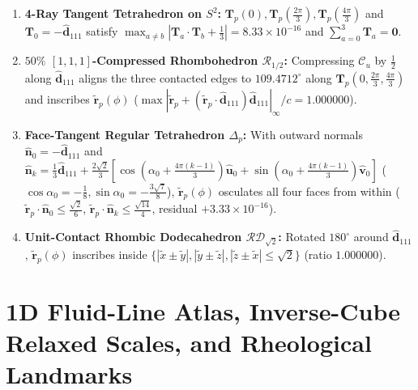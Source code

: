 \documentclass[11pt, a4paper]{article}
\begin{document}
\begin{enumerate}[leftmargin=1.8em, itemsep=2pt]
    \item \textbf{4-Ray Tangent Tetrahedron on $S^2$:} $\mathbf{T}_p(0), \mathbf{T}_p(\frac{2\pi}{3}), \mathbf{T}_p(\frac{4\pi}{3})$ and $\mathbf{T}_0 = -\hat{\mathbf{d}}_{111}$ satisfy $\max_{a\neq b}|\mathbf{T}_a\cdot\mathbf{T}_b + \frac{1}{3}| = 8.33 \times 10^{-16}$ and $\sum_{a=0}^3 \mathbf{T}_a = \mathbf{0}$.
    \item \textbf{$50\%$ $[1,1,1]$-Compressed Rhombohedron $\mathcal{R}_{1/2}$:} Compressing $\mathcal{C}_u$ by $\frac{1}{2}$ along $\hat{\mathbf{d}}_{111}$ aligns the three contacted edges to $109.4712^\circ$ along $\mathbf{T}_p(0,\frac{2\pi}{3},\frac{4\pi}{3})$ and inscribes $\tilde{\mathbf{r}}_p(\phi)$ ($\max|\tilde{\mathbf{r}}_p + (\tilde{\mathbf{r}}_p\cdot\hat{\mathbf{d}}_{111})\hat{\mathbf{d}}_{111}|_\infty / c = 1.000000$).
    \item \textbf{Face-Tangent Regular Tetrahedron $\Delta_p$:} With outward normals $\hat{\mathbf{n}}_0 = -\hat{\mathbf{d}}_{111}$ and $\hat{\mathbf{n}}_k = \frac{1}{3}\hat{\mathbf{d}}_{111} + \frac{2\sqrt{2}}{3}[\cos(\alpha_0 + \frac{4\pi(k-1)}{3})\hat{\mathbf{u}}_0 + \sin(\alpha_0 + \frac{4\pi(k-1)}{3})\hat{\mathbf{v}}_0]$ ($\cos\alpha_0 = -\frac{1}{8}, \sin\alpha_0 = -\frac{3\sqrt{7}}{8}$), $\tilde{\mathbf{r}}_p(\phi)$ osculates all four faces from within ($\tilde{\mathbf{r}}_p\cdot\hat{\mathbf{n}}_0 \le \frac{\sqrt{2}}{6}$, $\tilde{\mathbf{r}}_p\cdot\hat{\mathbf{n}}_k \le \frac{\sqrt{14}}{4}$, residual $+3.33 \times 10^{-16}$).
    \item \textbf{Unit-Contact Rhombic Dodecahedron $\mathcal{RD}_{\sqrt{2}}$:} Rotated $180^\circ$ around $\hat{\mathbf{d}}_{111}$, $\tilde{\mathbf{r}}_p(\phi)$ inscribes inside $\{|\tilde{x}\pm\tilde{y}|, |\tilde{y}\pm\tilde{z}|, |\tilde{z}\pm\tilde{x}| \le \sqrt{2}\}$ (ratio $1.000000$).
\end{enumerate}

\section{1D Fluid-Line Atlas, Inverse-Cube Relaxed Scales, and Rheological Landmarks}
\label{sec:derivatives_critical}
\end{document}
